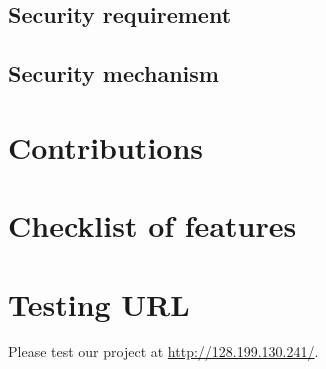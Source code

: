 \documentclass[a4paper,11pt]{article}
\theoremstyle{plain} %
\begin{document}
\subsection{Security requirement}


\subsection{Security mechanism}



\section{Contributions}

\section{Checklist of features}
 

\section{Testing URL}
Please test our project at \url{http://128.199.130.241/}.



\end{document}
